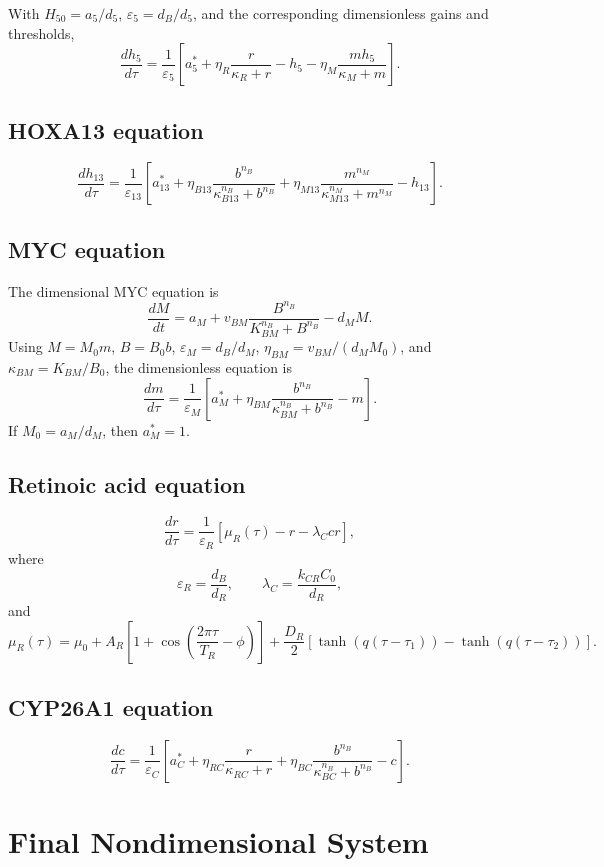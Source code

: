 \documentclass[11pt]{article}
\begin{document}
With \(H_{50}=a_5/d_5\), \(\varepsilon_5=d_B/d_5\), and the corresponding
dimensionless gains and thresholds,
\[
\boxed{
\frac{dh_5}{d\tau}
=
\frac{1}{\varepsilon_5}
\left[
a_5^*+\eta_R\frac{r}{\kappa_R+r}
-h_5-\eta_M\frac{mh_5}{\kappa_M+m}
\right].
}
\]

\subsection{HOXA13 equation}

\[
\boxed{
\frac{dh_{13}}{d\tau}
=
\frac{1}{\varepsilon_{13}}
\left[
a_{13}^*
+\eta_{B13}\frac{b^{n_B}}{\kappa_{B13}^{n_B}+b^{n_B}}
+\eta_{M13}\frac{m^{n_M}}{\kappa_{M13}^{n_M}+m^{n_M}}
-h_{13}
\right].
}
\]

\subsection{MYC equation}

The dimensional MYC equation is
\[
\boxed{
\frac{dM}{dt}
=
a_M+v_{BM}\frac{B^{n_B}}{K_{BM}^{n_B}+B^{n_B}}-d_MM.
}
\]
Using \(M=M_0m\), \(B=B_0b\), \(\varepsilon_M=d_B/d_M\),
\(\eta_{BM}=v_{BM}/(d_MM_0)\), and
\(\kappa_{BM}=K_{BM}/B_0\), the dimensionless equation is
\[
\boxed{
\frac{dm}{d\tau}
=
\frac{1}{\varepsilon_M}
\left[
a_M^*
+\eta_{BM}\frac{b^{n_B}}
{\kappa_{BM}^{n_B}+b^{n_B}}
-m
\right].
}
\]
If \(M_0=a_M/d_M\), then \(a_M^*=1\).

\subsection{Retinoic acid equation}

\[
\boxed{
\frac{dr}{d\tau}
=
\frac{1}{\varepsilon_R}
\left[
\mu_R(\tau)-r-\lambda_Ccr
\right],
}
\]
where
\[
\varepsilon_R=\frac{d_B}{d_R},\qquad
\lambda_C=\frac{k_{CR}C_0}{d_R},
\]
and
\[
\boxed{
\mu_R(\tau)
=
\mu_0
+A_R\left[
1+\cos\left(\frac{2\pi\tau}{T_R}-\phi\right)
\right]
+\frac{D_R}{2}
\left[
\tanh(q(\tau-\tau_1))-\tanh(q(\tau-\tau_2))
\right].
}
\]

\subsection{CYP26A1 equation}

\[
\boxed{
\frac{dc}{d\tau}
=
\frac{1}{\varepsilon_C}
\left[
a_C^*
+\eta_{RC}\frac{r}{\kappa_{RC}+r}
+\eta_{BC}\frac{b^{n_B}}{\kappa_{BC}^{n_B}+b^{n_B}}
-c
\right].
}
\]

\section{Final Nondimensional System}
\end{document}
